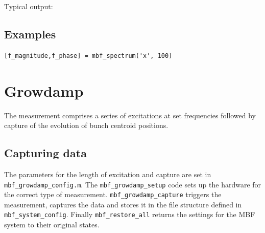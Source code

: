 \documentclass{report}
\begin{document}
Typical output:


\section{Examples}

\begin{verbatim}
[f_magnitude,f_phase] = mbf_spectrum('x', 100)
\end{verbatim}

\chapter{Growdamp}
The measurement comprises a series of excitations at set frequencies followed by capture of the evolution of bunch centroid positions.
\section{Capturing data}
The parameters for the length of excitation and  capture are set in \verb|mbf_growdamp_config.m|. The \verb|mbf_growdamp_setup| code sets up the hardware for the correct type of measurement. \verb|mbf_growdamp_capture| triggers the measurement, captures the data and stores it in the file structure defined in \verb|mbf_system_config|. Finally \verb|mbf_restore_all| returns the settings for the MBF system to their original states.
\end{document}
